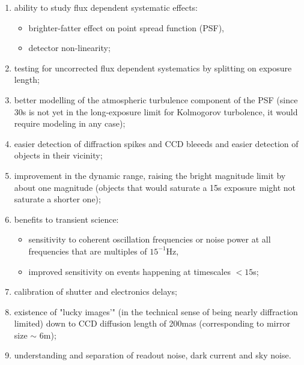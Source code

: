 \documentclass[12pt, a4paper]{article}
\begin{document}
\begin{enumerate}

\item ability to study flux dependent systematic effects:
  \begin{itemize}
  \item brighter-fatter effect on point spread function (PSF),
  \item detector non-linearity;
\end{itemize}

\item testing for uncorrected flux dependent systematics by
  splitting on exposure length;

\item better modelling of the atmospheric turbulence component of the PSF
  (since 30s is not yet in the long-exposure limit for Kolmogorov
  turbolence, it would require modeling in any case);

\item easier detection of diffraction spikes and CCD bleeeds and
  easier detection of objects in their vicinity;

\item improvement in the dynamic range, raising the bright
  magnitude limit by about one magnitude (objects that would
  saturate a 15s exposure might not saturate a shorter one);

\item benefits to transient science:
  \begin{itemize}
  \item sensitivity to coherent oscillation frequencies or noise power at all
    frequencies that are multiples  of $15^{-1}$Hz,
  \item improved sensitivity on events happening at timescales $<15$s;
  \end{itemize}

\item calibration of shutter and electronics delays;

\item existence of "lucky images'" (in the technical sense of being
  nearly diffraction limited) down to CCD diffusion length of 200mas
  (corresponding to mirror size $\sim$ 6m);

\item understanding and separation of readout noise, dark
  current and sky noise.

\end{enumerate}
\end{document}
